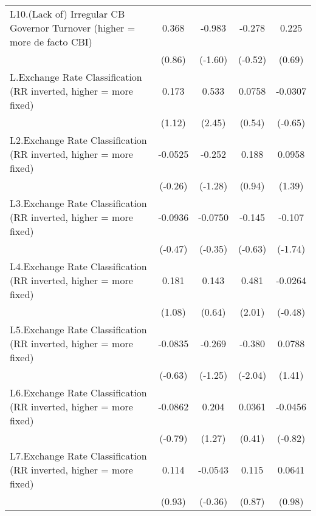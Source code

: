 {\begin{longtable}{l*{4}{c}}
\addlinespace
L10.(Lack of) Irregular CB Governor Turnover (higher = more de facto CBI)&    0.368         &   -0.983         &   -0.278         &    0.225         \\
                &   (0.86)         &  (-1.60)         &  (-0.52)         &   (0.69)         \\
\addlinespace
L.Exchange Rate Classification (RR inverted, higher = more fixed)&    0.173         &    0.533\sym{*}  &   0.0758         &  -0.0307         \\
                &   (1.12)         &   (2.45)         &   (0.54)         &  (-0.65)         \\
\addlinespace
L2.Exchange Rate Classification (RR inverted, higher = more fixed)&  -0.0525         &   -0.252         &    0.188         &   0.0958         \\
                &  (-0.26)         &  (-1.28)         &   (0.94)         &   (1.39)         \\
\addlinespace
L3.Exchange Rate Classification (RR inverted, higher = more fixed)&  -0.0936         &  -0.0750         &   -0.145         &   -0.107         \\
                &  (-0.47)         &  (-0.35)         &  (-0.63)         &  (-1.74)         \\
\addlinespace
L4.Exchange Rate Classification (RR inverted, higher = more fixed)&    0.181         &    0.143         &    0.481\sym{*}  &  -0.0264         \\
                &   (1.08)         &   (0.64)         &   (2.01)         &  (-0.48)         \\
\addlinespace
L5.Exchange Rate Classification (RR inverted, higher = more fixed)&  -0.0835         &   -0.269         &   -0.380\sym{*}  &   0.0788         \\
                &  (-0.63)         &  (-1.25)         &  (-2.04)         &   (1.41)         \\
\addlinespace
L6.Exchange Rate Classification (RR inverted, higher = more fixed)&  -0.0862         &    0.204         &   0.0361         &  -0.0456         \\
                &  (-0.79)         &   (1.27)         &   (0.41)         &  (-0.82)         \\
\addlinespace
L7.Exchange Rate Classification (RR inverted, higher = more fixed)&    0.114         &  -0.0543         &    0.115         &   0.0641         \\
                &   (0.93)         &  (-0.36)         &   (0.87)         &   (0.98)         \\

\end{longtable}}
